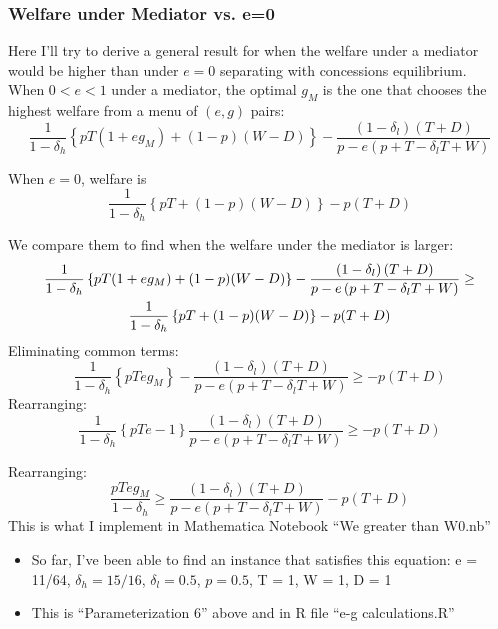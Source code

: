\documentclass[12pt]{article}
\newcommand{\de}{\delta}
\begin{document}
								
\subsubsection{Welfare under Mediator vs. e=0}
\label{sec:WM0}
Here I'll try to derive a general result for when the welfare under a mediator would be higher than under $e=0$ separating with concessions equilibrium. \\

When $0<e<1$ under a mediator, the optimal $g_M$ is the one that chooses the highest welfare from a menu of $(e,g)$ pairs:
$$\frac{1}{1-\de_h}\left\{pT(1+eg_M) + (1-p)(W-D)\right\} - \frac{\left(1 - \de_l \right) \left( T + D \right)}{p - e \left( p + T - \de_l T + W \right)}$$

When $e=0$, welfare is $$\frac{1}{1-\de_h}\left\{pT + (1-p)(W-D)\right\} - p(T+D)$$

We compare them to find when the welfare under the mediator is larger:
	\begin{multline*}
		\frac{1}{1-\de_h}\left\{pT(1+eg_M) + (1-p)(W-D)\right\} - \frac{\left(1 - \de_l \right) \left( T + D \right)}{p - e \left( p + T - \de_l T + W \right)} \geq \\
		\frac{1}{1-\de_h}\left\{pT + (1-p)(W-D)\right\} - p(T+D)$$
	\end{multline*}							
Eliminating common terms:
	\begin{equation*}
		\frac{1}{1-\de_h}\left\{pTeg_M \right\} - \frac{\left(1 - \de_l \right) \left( T + D \right)}{p - e \left( p + T - \de_l T + W \right)} \geq - p(T+D)
	\end{equation*}	
Rearranging:
	\begin{equation*}
		\frac{1}{1-\de_h}\left\{pTe - 1 \right\} \frac{\left(1 - \de_l \right) \left( T + D \right)}{p - e \left( p + T - \de_l T + W \right)} \geq - p(T+D)
	\end{equation*}	

Rearranging:
\begin{equation*}
		\frac{pTeg_M}{1-\de_h} \geq \frac{\left(1 - \de_l \right) \left( T + D \right)}{p - e \left( p + T - \de_l T + W \right)} - p(T+D)
	\end{equation*}	
This is what I implement in Mathematica Notebook ``We greater than W0.nb''
\begin{itemize}
	\item So far, I've been able to find an instance that satisfies this equation: e = 11/64, $\de_h = 15/16$, $\de_l = 0.5$, $p = 0.5$, T = 1, W = 1, D = 1
	\item This is ``Parameterization 6'' above and in R file ``e-g calculations.R''
\end{itemize}
			
\end{document}
